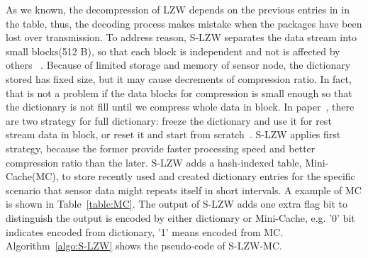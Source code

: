 As we known, the decompression of LZW depends on the previous entries in in the
table, thus, the decoding process makes mistake when the packages have been lost
over transmission. To address reason, S-LZW separates the data stream into small
blocks(512 B), so that each block is independent and not is affected by
others~\cite{sadler2006data} . Because of limited storage and memory of sensor
node, the dictionary stored has fixed size, but it may cause decrements of
compression ratio. In fact, that is not a problem if the data blocks for
compression is small enough so that the dictionary is not fill until we compress
whole data in block. In paper~\cite{sadler2006data}, there are two strategy for
full dictionary: freeze the dictionary and use it for rest stream data in block,
or reset it and start from scratch~\cite{sadler2006data}. S-LZW applies first
strategy, because the former provide faster processing speed and better
compression ratio than the later. S-LZW adds a hash-indexed table,
Mini-Cache(MC), to store recently used and created dictionary entries for the
specific scenario that sensor data might repeats itself in short intervals. A
example of MC is shown in Table~\ref{table:MC}. The output of S-LZW adds one
extra flag bit to distinguish the output is encoded by either dictionary or
Mini-Cache, e.g. '0' bit indicates encoded from dictionary, '1' means encoded
from MC. Algorithm~\ref{algo:S-LZW} shows the pseudo-code of S-LZW-MC.

